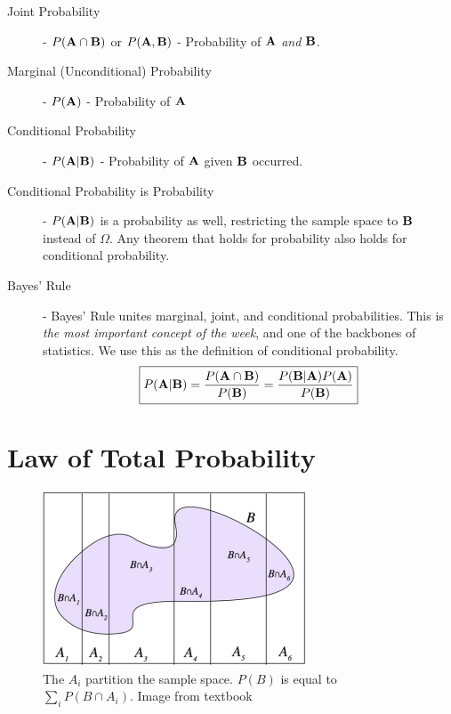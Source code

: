 \documentclass[11pt]{article}
\begin{document}
  \begin{description}
    \item[Joint Probability] - $P({\bf A} \cap {\bf B}) $ or $P({\bf A}, {\bf B})$ - Probability of ${\bf A}$ \emph{and} ${\bf B}$.
    \item[Marginal (Unconditional) Probability] - $P({\bf A})$ - Probability of ${\bf A}$
    \item[Conditional Probability] - $P({\bf A}|{\bf B})$ - Probability of ${\bf A}$ given ${\bf B}$ occurred.
    \item[Conditional Probability is Probability] - $P({\bf A}|{\bf B})$ is a probability as well, restricting the sample space to ${\bf B}$ instead of $\Omega$. Any theorem that holds for probability also holds for conditional probability.
    \item[Bayes' Rule] - Bayes' Rule unites marginal, joint, and conditional probabilities. This is \emph{the most important concept of the week}, and one of the backbones of statistics. We use this as the definition of conditional probability.
  \[\boxed{P({\bf A}|{\bf B}) = \frac{P({\bf A} \cap {\bf B})}{P({\bf B})} = \frac{P({\bf B}|{\bf A})P({\bf A})}{P({\bf B})}}\]

  \end{description}

\section*{Law of Total Probability}

\begin{figure}[h!]\centering
  \includegraphics[width = 0.7\textwidth]{LOTP.jpg}
  \caption{The $A_i$ partition the sample space. $P(B)$ is equal to $\sum_i P (B \cap A_i)$. Image from textbook}
\end{figure}
\end{document}
